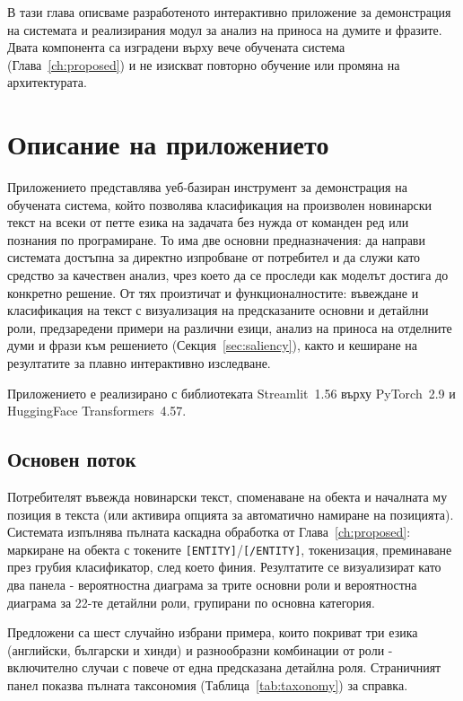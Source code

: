\documentclass[12pt,a4paper]{report}
\begin{document}
В тази глава описваме разработеното интерактивно приложение за демонстрация на системата и реализирания модул за анализ на приноса на думите и фразите. Двата компонента са изградени върху вече обучената система (Глава~\ref{ch:proposed}) и не изискват повторно обучение или промяна на архитектурата.


\section{Описание на приложението}
\label{sec:demo_app}

Приложението представлява уеб-базиран инструмент за демонстрация на обучената система, който позволява класификация на произволен новинарски текст на всеки от петте езика на задачата без нужда от команден ред или познания по програмиране. То има две основни предназначения: да направи системата достъпна за директно изпробване от потребител и да служи като средство за качествен анализ, чрез което да се проследи как моделът достига до конкретно решение. От тях произтичат и функционалностите: въвеждане и класификация на текст с визуализация на предсказаните основни и детайлни роли, предзаредени примери на различни езици, анализ на приноса на отделните думи и фрази към решението (Секция~\ref{sec:saliency}), както и кеширане на резултатите за плавно интерактивно изследване.

Приложението е реализирано с библиотеката Streamlit~1.56 върху PyTorch~2.9 и HuggingFace Transformers~4.57.

\subsection{Основен поток}

Потребителят въвежда новинарски текст, споменаване на обекта и началната му позиция в текста (или активира опцията за автоматично намиране на позицията). Системата изпълнява пълната каскадна обработка от Глава~\ref{ch:proposed}: маркиране на обекта с токените \texttt{[ENTITY]}/\texttt{[/ENTITY]}, токенизация, преминаване през грубия класификатор, след което финия. Резултатите се визуализират като два панела - вероятностна диаграма за трите основни роли и вероятностна диаграма за 22-те детайлни роли, групирани по основна категория.

Предложени са шест случайно избрани примера, които покриват три езика (английски, български и хинди) и разнообразни комбинации от роли - включително случаи с повече от една предсказана детайлна роля. Страничният панел показва пълната таксономия (Таблица~\ref{tab:taxonomy}) за справка.
\end{document}
